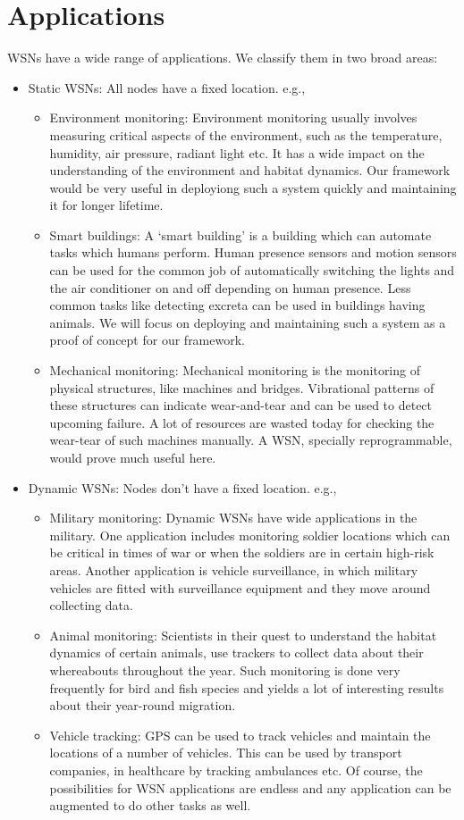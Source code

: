 \documentclass[twocolumn]{article}
\begin{document}
\section{Applications}
WSNs have a wide range of applications. We classify them in two broad areas:
\begin{itemize}
\item Static WSNs: All nodes have a fixed location. e.g.,\
\begin{itemize}
\item Environment monitoring: Environment monitoring usually involves measuring critical aspects of the environment, such as the temperature, humidity, air pressure, radiant light etc. It has a wide impact on the understanding of the environment and habitat dynamics. Our framework would be very useful in deployiong such a system quickly and maintaining it for longer lifetime.
\item Smart buildings: A `smart building' is a building which can automate tasks which humans perform. Human presence sensors and motion sensors can be used for the common job of automatically switching the lights and the air conditioner on and off depending on human presence. Less common tasks like detecting excreta can be used in buildings having animals. We will focus on deploying and maintaining such a system as a proof of concept for our framework.
\item Mechanical monitoring: Mechanical monitoring is the monitoring of physical structures, like machines and bridges. Vibrational patterns of these structures can indicate wear-and-tear and can be used to detect upcoming failure. A lot of resources are wasted today for checking the wear-tear of such machines manually. A WSN, specially reprogrammable, would prove much useful here.
\end{itemize}
\item Dynamic WSNs: Nodes don't have a fixed location. e.g.,\
\begin{itemize}
\item Military monitoring: Dynamic WSNs have wide applications in the military. One application includes monitoring soldier locations which can be critical in times of war or when the soldiers are in certain high-risk areas. Another application is vehicle surveillance, in which military vehicles are fitted with surveillance equipment and they move around collecting data.
\item Animal monitoring: Scientists in their quest to understand the habitat dynamics of certain animals, use trackers to collect data about their whereabouts throughout the year. Such monitoring is done very frequently for bird and fish species and yields a lot of interesting results about their year-round migration.
\item Vehicle tracking: GPS can be used to track vehicles and maintain the locations of a number of vehicles. This can be used by transport companies, in healthcare by tracking ambulances etc.
Of course, the possibilities for WSN applications are endless and any application can be augmented to do other tasks as well.
\end{itemize}
\end{itemize}
\end{document}
